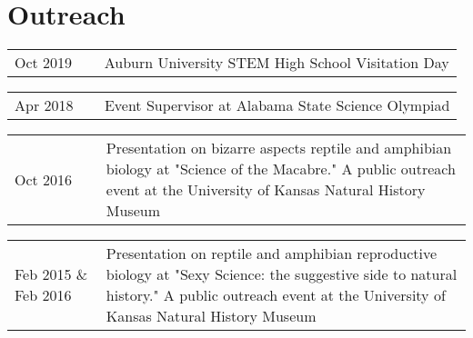\section*{Outreach}

\begin{tabular}{ p{0.2\linewidth} p{0.8\linewidth} }
    Oct 2019  & Auburn University STEM High School Visitation Day \\
\end{tabular}

\bigskip
\noindent

\begin{tabular}{ p{0.2\linewidth} p{0.8\linewidth} }
    Apr 2018  & Event Supervisor at Alabama State Science Olympiad \\
\end{tabular}

\bigskip
\noindent
\begin{tabular}{ p{0.2\linewidth} p{0.8\linewidth} }
        Oct 2016 & Presentation on bizarre aspects reptile and amphibian biology at "Science of the Macabre." A public outreach event at the University of Kansas Natural History Museum %
\end{tabular}
\begin{tabular}{ p{0.2\linewidth} p{0.8\linewidth} }
        Feb 2015 \& Feb 2016 & Presentation on reptile and amphibian reproductive biology at "Sexy Science: the suggestive side to natural history." A public outreach event at the University of Kansas Natural History Museum %
\end{tabular}
